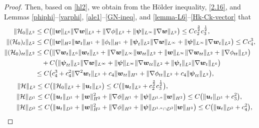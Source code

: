 \documentclass[11pt,reqno]{amsart}
\numberwithin{rk}{section}
\numberwithin{prop}{section}
\numberwithin{mydef}{section}
\numberwithin{lem}{section}
\numberwithin{equation}{section}
\numberwithin{thm}{section}
\begin{document}
\begin{proof}
Then, based on \eqref{hl2}, we obtain from the H\"older inequality, \eqref{2.16}, and Lemmas  \ref{phiphi}--\ref{varphi}, \ref{ale1}--\ref{GN-ineq}, and \ref{lemma-L6}--\ref{Hk-Ck-vector} that
\begin{align}
&\begin{aligned}
\|\mathcal{H}_0\|_{L^2}
&\leq C\big(\|\boldsymbol{w}\|_{L^6}\|\nabla \boldsymbol{w}\|_{L^3}+\|\nabla\phi\|_{L^2}+\|\boldsymbol{\psi}\|_{L^\infty}\|\nabla \boldsymbol{w}\|_{L^2}\big)\leq C c_2^{\frac{3}{2}}   c_3^{\frac{1}{2}},\notag\\
\|(\mathcal{H}_0)_t\|_{L^2}&\leq  C\big(\|\boldsymbol{w}\|_{H^2}\| \boldsymbol{w}_t\|_{H^1}+\| \phi_t\|_{H^1}+\|\boldsymbol{\psi}_t\|_{L^2}\|\nabla \boldsymbol{w}\|_{L^\infty}+\|\boldsymbol{\psi}\|_{L^\infty}\|\nabla \boldsymbol{w}_t\|_{L^2}\big)\leq Cc^3_4,\notag \\
\|(\mathcal{H}_0)_{tt}\|_{L^2}&\leq C \big(\|\nabla \boldsymbol{w}_t\|_{L^6}\|\boldsymbol{w}_t\|_{L^3}+\|\nabla \boldsymbol{w}\|_{L^\infty}\|\boldsymbol{w}_{tt}\|_{L^2}+\|\boldsymbol{w}\|_{L^\infty}\|\nabla \boldsymbol{w}_{tt}\|_{L^2}+\|\nabla\phi_{tt}\|_{L^2}\big)\notag\\
&\quad + C\big(\|\boldsymbol{\psi}_{tt}\|_{L^2}\|\nabla \boldsymbol{w}\|_{L^\infty}+\|\boldsymbol{\psi}\|_{L^\infty}\|\nabla \boldsymbol{w}_{tt}\|_{L^2}
+\|\boldsymbol{\psi}_t\|_{L^3}\|\nabla \boldsymbol{w}_t\|_{L^6}\big)\notag\\
&\leq C \big(c^3_4+c_4^2\|\nabla^2 \boldsymbol{w}_t\|_{L^2}+c_4\|\boldsymbol{w}_{tt}\|_{H^1} +\|\nabla\phi_{tt}\|_{L^2}+c_4\|\boldsymbol{\psi}_{tt}\|_{L^2}\big)\notag,
\end{aligned}\\
&\hspace{6.5mm}\begin{aligned}
\|\mathcal{H}\|_{L^2}&\leq C\big(\|\mathcal{H}_0\|_{L^2}+\|\boldsymbol{u}_t\|_{L^2}\big)\leq C\big(\|\boldsymbol{u}_t\|_{L^2}+ c_2^{\frac{3}{2}}c_3^{\frac{1}{2}}\big),\notag\\
\|\mathcal{H}\|_{D^1}
&\leq C\big(\|\boldsymbol{u}_t\|_{D^1}+\|\boldsymbol{w}\|_{H^2}^2+\|\nabla\phi\|_{H^1}+\|\boldsymbol{\psi}\|_{D^{1,n}}\|\boldsymbol{w}\|_{H^2}\big)\leq C\big(\|\boldsymbol{u}_t\|_{D^1}+c_3^2\big),\notag\\
\|\mathcal{H}\|_{D^2}&\leq C\big(\|\boldsymbol{u}_t\|_{D^2}+\|\boldsymbol{w}\|_{H^3}^2+\|\nabla \phi\|_{H^2} +\|\boldsymbol{\psi}\|_{ D^{1,n}\cap D^2}\|\boldsymbol{w}\|_{H^3}\big) \leq  C\big(\|\boldsymbol{u}_t\|_{D^2}+c_4^2\big),\notag 
\end{aligned}\\

\end{align}
\end{proof}
\end{document}
